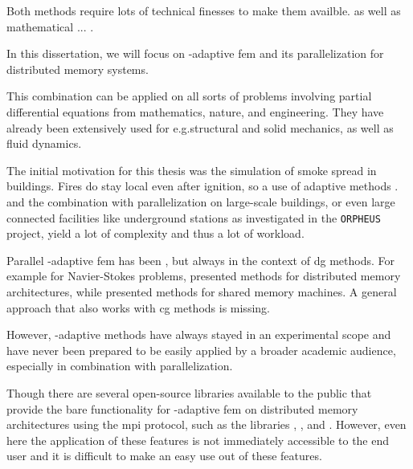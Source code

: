 Both methods require lots of technical finesses to make them availble. as well as mathematical ... .

In this dissertation, we will focus on \hp-adaptive \gls{fem} and its parallelization for distributed memory systems.

%
%
%
%
%
%


This combination can be applied on all sorts of problems involving partial differential equations from mathematics, nature, and engineering. They have already been extensively used for e.g.\@ structural and solid mechanics, as well as fluid dynamics.

The initial motivation for this thesis was the simulation of smoke spread in buildings. Fires do stay local even after ignition, so a use of adaptive methods . and the combination with parallelization on large-scale buildings, or even large connected facilities like underground stations as investigated in the \texttt{ORPHEUS} project, yield a lot of complexity and thus a lot of workload.


Parallel \hp-adaptive \gls{fem} has been , but always in the context of \gls{dg} methods. For example for Navier-Stokes problems, \textcites{paszynski2006}{chalmers2019} presented methods for distributed memory architectures, while \textcites{paszynski2011}{jomo2017} presented methods for shared memory machines. A general approach that also works with \gls{cg} methods is missing.


However, \hp-adaptive methods have always stayed in an experimental scope and have never been prepared to be easily applied by a broader academic audience, especially in combination with parallelization.

Though there are several open-source libraries available to the public that provide the bare functionality for \hp-adaptive \gls{fem} on distributed memory architectures using the \gls{mpi} protocol, such as the libraries \phaml{} \parencite{mitchell2002,phaml1200}, \phg{} \parencite{zhanglin-bo2019,phg094}, and \mofem{} \parencite{kaczmarczyk2020,mofem090}. However, even here the application of these features is not immediately accessible to the end user and it is difficult to make an easy use out of these features.

